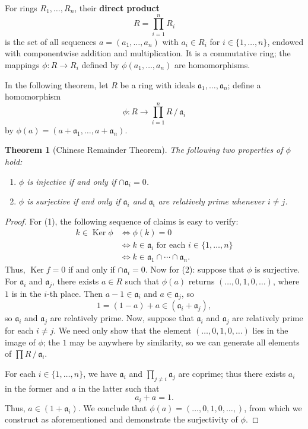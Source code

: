 \documentclass[11pt]{article}
\newtheorem{theorem}{Theorem}
\newcommand{\Ker}{\operatorname{Ker}}
\begin{document}
For rings $R_{1}, \ldots, R_{n}$, their \textbf{direct product} 
\[
	R = \prod\limits_{i = 1}^{n} R_{i}
\]
is the set of all sequences $a = (a_{1}, \ldots, a_{n})$ with $a_{i} \in R_{i}$ for $i \in \{ 1, \ldots, n \}$, endowed with componentwise addition and multiplication. It is a commutative ring; the mappings $\phi : R \to R_{i}$ defined by $\phi(a_{1}, \ldots, a_{n})$ are homomorphisms.

In the following theorem, let $R$ be a ring with ideals $\mathfrak{a}_{1}, \ldots, \mathfrak{a}_{n}$; define a homomorphism
\[
	\phi : R \to \prod_{i = 1}^{n} R \,/\, \mathfrak{a}_{i}
\]
by $\phi(a) = (a + \mathfrak{a}_{1}, \ldots, a + \mathfrak{a}_{n})$.

\begin{adjustwidth}{0.5cm}{}
	\begin{theorem}[Chinese Remainder Theorem]
		The following two properties of $\phi$ hold:
		\begin{enumerate}
			\item $\phi$ is injective if and only if $\cap \mathfrak{a}_{i} = 0$.
			\item $\phi$ is surjective if and only if $\mathfrak{a}_{i}$ and $\mathfrak{a_{i}}$ are relatively prime whenever $i \ne j$.
		\end{enumerate}
	\end{theorem}
	\begin{proof}
		For (1), the following sequence of claims is easy to verify:
		\begin{align*}
			k \in \Ker \phi &\iff \phi(k) = 0 \\
			&\iff k \in \mathfrak{a}_{i} \text{ for each } i \in \{ 1, \ldots, n \} \\
			&\iff k \in \mathfrak{a}_{1} \cap \cdots \cap \mathfrak{a}_{n}.
		\end{align*}
		 Thus, $\Ker f = 0$ if and only if $\cap \mathfrak{a}_{i} = 0$. Now for (2): suppose that $\phi$ is surjective. For $\mathfrak{a}_{i}$ and $\mathfrak{a}_{j}$, there exists $a \in R$ such that $\phi(a)$ returns $(\ldots, 0, 1, 0, \ldots)$, where $1$ is in the $i$-th place. Then $a - 1 \in \mathfrak{a}_{i}$ and $a \in \mathfrak{a}_{j}$, so
		 \[
		 	1  = (1 - a) + a \in (\mathfrak{a}_{i} + \mathfrak{a}_{j}),
		 \]
		so $\mathfrak{a}_{i}$ and $\mathfrak{a}_{j}$ are relatively prime. Now, suppose that $\mathfrak{a}_{i}$ and $\mathfrak{a}_{j}$ are relatively prime for each $i \ne j$. We need only show that the element $(\ldots, 0, 1, 0, \ldots)$ lies in the image of $\phi$; the $1$ may be anywhere by similarity, so we can generate all elements of $\prod R \,/\, \mathfrak{a}_{i}$.

		For each $i \in \{ 1, \ldots, n \}$, we have $\mathfrak{a}_{i}$ and $\prod_{j \ne i} \mathfrak{a}_{j}$ are coprime; thus there exists $a_{i}$ in the former and $a$ in the latter such that
		\[
			a_{i} + a = 1.
		\]
		Thus, $a \in (1 + \mathfrak{a}_{i})$. We conclude that $\phi(a) = (\ldots, 0, 1, 0, \ldots,)$, from which we construct as aforementioned and demonstrate the surjectivity of $\phi$.
	\end{proof}
\end{adjustwidth}
\end{document}
